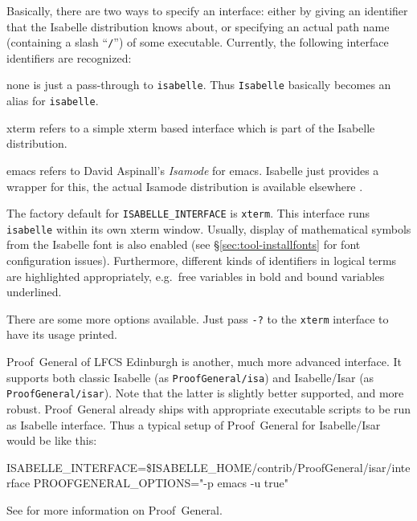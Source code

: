 Basically, there are two ways to specify an interface: either by giving an
identifier that the Isabelle distribution knows about, or specifying an actual
path name (containing a slash ``\texttt{/}'') of some executable.  Currently,
the following interface identifiers are recognized:
\begin{ttdescription}
\item[none] is just a pass-through to \texttt{isabelle}. Thus
  \texttt{Isabelle} basically becomes an alias for \texttt{isabelle}.

\item[xterm] refers to a simple xterm based interface which is part of
  the Isabelle distribution.
  
\item[emacs] refers to David Aspinall's \emph{Isamode} for emacs.  Isabelle just provides a wrapper for this,
  the actual Isamode distribution is available elsewhere \cite{isamode}.
\end{ttdescription}

The factory default for \texttt{ISABELLE_INTERFACE} is \texttt{xterm}.
This interface runs \texttt{isabelle} within its own xterm window.
Usually, display of mathematical symbols from the Isabelle font is
also enabled (see \S\ref{sec:tool-installfonts} for font configuration
issues).  Furthermore, different kinds of identifiers in logical terms
are highlighted appropriately, e.g.\ free variables in bold and bound
variables underlined.

There are some more options available.  Just pass \texttt{-?} to the
\texttt{xterm} interface to have its usage printed.

\medskip

Proof~General of LFCS Edinburgh is
another, much more advanced interface.  It supports both classic Isabelle (as
\texttt{ProofGeneral/isa}) and Isabelle/Isar (as \texttt{ProofGeneral/isar}).
Note that the latter is slightly better supported, and more robust.
Proof~General already ships with appropriate executable scripts to be run as
Isabelle interface.  Thus a typical setup of Proof~General for Isabelle/Isar
would be like this:
\begin{ttbox}
ISABELLE_INTERFACE=\$ISABELLE_HOME/contrib/ProofGeneral/isar/interface
PROOFGENERAL_OPTIONS="-p emacs -u true"
\end{ttbox}
See \cite{proofgeneral} for more information on Proof~General.


